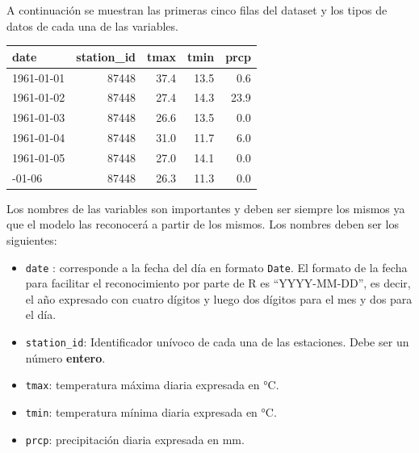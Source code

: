 \documentclass[
  12pt]{article}
\newenvironment{Shaded}{}{}
\newcommand{\CommentTok}[1]{\textcolor[rgb]{0.38,0.63,0.69}{\textit{#1}}}
\newcommand{\DataTypeTok}[1]{\textcolor[rgb]{0.56,0.13,0.00}{#1}}
\newcommand{\KeywordTok}[1]{\textcolor[rgb]{0.00,0.44,0.13}{\textbf{#1}}}
\newcommand{\NormalTok}[1]{#1}
\newcommand{\OperatorTok}[1]{\textcolor[rgb]{0.40,0.40,0.40}{#1}}
\newcommand{\StringTok}[1]{\textcolor[rgb]{0.25,0.44,0.63}{#1}}
\providecommand{\tightlist}{%
  \setlength{\itemsep}{0pt}\setlength{\parskip}{0pt}}
\begin{document}
A continuación se muestran las primeras cinco filas del dataset y los tipos de datos de cada una de las variables.

\begin{Shaded}
\end{Shaded}

\begin{table}[H]
\centering
\begin{tabular}{lrrrr}
\toprule
date & station\_id & tmax & tmin & prcp\\
\midrule
1961-01-01 & 87448 & 37.4 & 13.5 & 0.6\\
1961-01-02 & 87448 & 27.4 & 14.3 & 23.9\\
1961-01-03 & 87448 & 26.6 & 13.5 & 0.0\\
1961-01-04 & 87448 & 31.0 & 11.7 & 6.0\\
1961-01-05 & 87448 & 27.0 & 14.1 & 0.0\\
\addlinespace
1961-01-06 & 87448 & 26.3 & 11.3 & 0.0\\
\bottomrule
\end{tabular}
\end{table}

Los nombres de las variables son importantes y deben ser siempre los mismos ya que el modelo las reconocerá a partir de los mismos. Los nombres deben ser los siguientes:

\begin{itemize}
\tightlist
\item
  \texttt{date} : corresponde a la fecha del día en formato \texttt{Date}. El formato de la fecha para facilitar el reconocimiento por parte de R es ``YYYY-MM-DD'', es decir, el año expresado con cuatro dígitos y luego dos dígitos para el mes y dos para el día.
\item
  \texttt{station\_id}: Identificador unívoco de cada una de las estaciones. Debe ser un número \textbf{entero}.
\item
  \texttt{tmax}: temperatura máxima diaria expresada en °C.
\item
  \texttt{tmin}: temperatura mínima diaria expresada en °C.
\item
  \texttt{prcp}: precipitación diaria expresada en mm.
\end{itemize}
\end{document}

